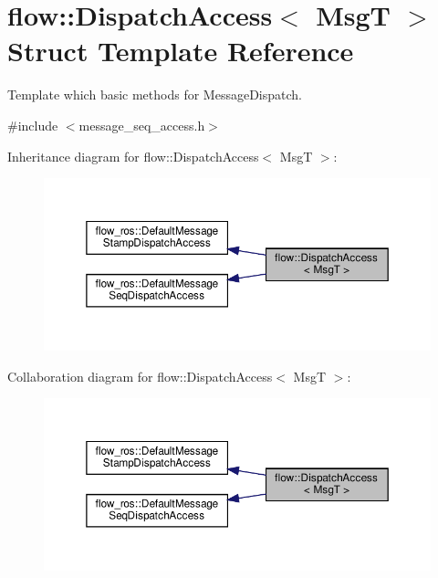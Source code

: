 \hypertarget{structflow_1_1_dispatch_access}{}\section{flow\+:\+:Dispatch\+Access$<$ MsgT $>$ Struct Template Reference}
\label{structflow_1_1_dispatch_access}


Template which basic methods for Message\+Dispatch.  




{\ttfamily \#include $<$message\+\_\+seq\+\_\+access.\+h$>$}



Inheritance diagram for flow\+:\+:Dispatch\+Access$<$ MsgT $>$\+:\nopagebreak
\begin{figure}[H]
\begin{center}
\leavevmode
\includegraphics[width=350pt]{structflow_1_1_dispatch_access__inherit__graph}
\end{center}
\end{figure}


Collaboration diagram for flow\+:\+:Dispatch\+Access$<$ MsgT $>$\+:\nopagebreak
\begin{figure}[H]
\begin{center}
\leavevmode
\includegraphics[width=350pt]{structflow_1_1_dispatch_access__coll__graph}
\end{center}
\end{figure}
